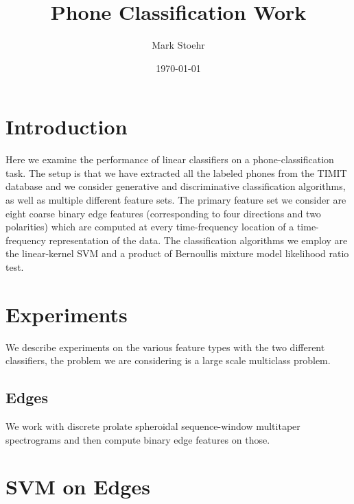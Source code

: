 \documentclass{article}
\title{Phone Classification Work}
\author{Mark Stoehr}
\date{\today}
\begin{document}
\maketitle

\section{Introduction}

Here we examine the performance of linear classifiers on a phone-classification task.  The setup is that we have
extracted all the labeled phones from the TIMIT database and we consider generative and discriminative classification
algorithms, as well as multiple different feature sets.  The primary feature set we consider are eight coarse binary edge features
(corresponding to four directions and two polarities) which are computed
at every time-frequency location of a time-frequency representation of the data.  The classification algorithms we employ
are the linear-kernel SVM and a product of Bernoullis mixture model likelihood ratio test.

\section{Experiments}

We describe experiments on the various feature types with the two different classifiers, the problem we are considering is a large
scale multiclass problem.

\subsection{Edges}

We work with discrete prolate spheroidal sequence-window multitaper spectrograms and then compute binary edge features on those.

\section{SVM on Edges}
\end{document}
